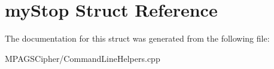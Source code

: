 \hypertarget{structmy_stop}{\section{my\-Stop Struct Reference}
\label{structmy_stop}
}


The documentation for this struct was generated from the following file\-:\begin{DoxyCompactItemize}
\item 
M\-P\-A\-G\-S\-Cipher/Command\-Line\-Helpers.\-cpp\end{DoxyCompactItemize}
